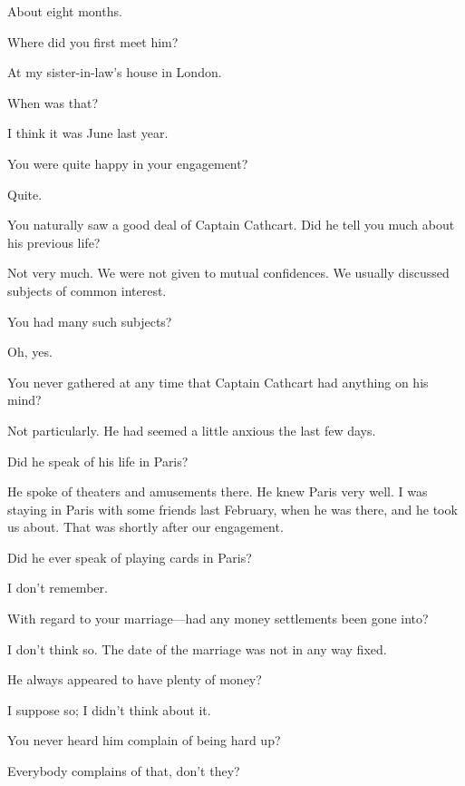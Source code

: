 \begin{dialogue}
 About eight months.

 Where did you first meet him?

 At my sister-in-law's house in London.

 When was that?

 I think it was June last year.

 You were quite happy in your engagement?

 Quite.

 You naturally saw a good deal of Captain Cathcart. Did he tell you much about his previous life?

 Not very much. We were not given to mutual confidences. We usually discussed subjects of common interest.

 You had many such subjects?

 Oh, yes.

 You never gathered at any time that Captain Cathcart had anything on his mind?

 Not particularly. He had seemed a little anxious the last few days.

 Did he speak of his life in Paris?

 He spoke of theaters and amusements there. He knew Paris very well. I was staying in Paris with some friends last February, when he was there, and he took us about. That was shortly after our engagement.

 Did he ever speak of playing cards in Paris?

 I don't remember.

 With regard to your marriage\allowbreak---\allowbreak had any money settlements been gone into?

 I don't think so. The date of the marriage was not in any way fixed.

 He always appeared to have plenty of money?

 I suppose so; I didn't think about it.

 You never heard him complain of being hard up?

 Everybody complains of that, don't they?


\end{dialogue}
